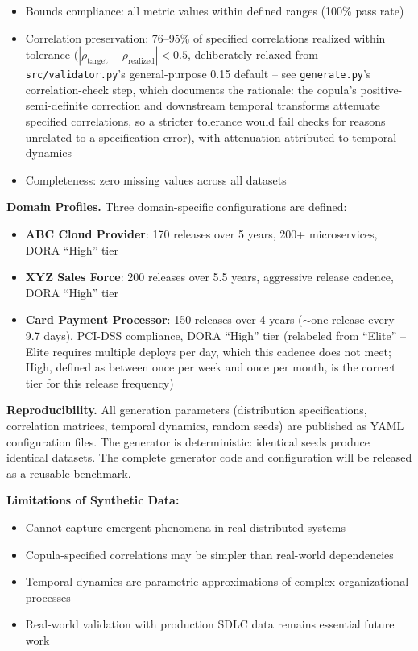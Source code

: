 \documentclass[technologies,article,submit,pdftex,moreauthors]{Definitions/mdpi}
\begin{document}
\begin{itemize}
\item
  Bounds compliance: all metric values within defined ranges (100\% pass
  rate)
\item
  Correlation preservation: 76--95\% of specified correlations realized
  within tolerance
  (\(|\rho_{\text{target}} - \rho_{\text{realized}}| < 0.5\), deliberately
  relaxed from \texttt{src/validator.py}'s general-purpose 0.15 default --
  see \texttt{generate.py}'s correlation-check step, which documents the
  rationale: the copula's positive-semi-definite correction and
  downstream temporal transforms attenuate specified correlations, so a
  stricter tolerance would fail checks for reasons unrelated to a
  specification error), with
  attenuation attributed to temporal dynamics
\item
  Completeness: zero missing values across all datasets
\end{itemize}

\textbf{Domain Profiles.} Three domain-specific configurations are
defined:

\begin{itemize}
\item
  \textbf{ABC Cloud Provider}: 170 releases over 5 years, 200+
  microservices, DORA ``High'' tier
\item
  \textbf{XYZ Sales Force}: 200 releases over 5.5 years, aggressive
  release cadence, DORA ``High'' tier
\item
  \textbf{Card Payment Processor}: 150 releases over 4 years
  ($\sim$one release every 9.7 days), PCI-DSS
  compliance, DORA ``High'' tier (relabeled from ``Elite'' -- Elite
  requires multiple deploys per day, which this cadence does not meet;
  High, defined as between once per week and once per month, is the
  correct tier for this release frequency)
\end{itemize}

\textbf{Reproducibility.} All generation parameters (distribution
specifications, correlation matrices, temporal dynamics, random seeds)
are published as YAML configuration files. The generator is
deterministic: identical seeds produce identical datasets. The complete
generator code and configuration will be released as a reusable
benchmark.

\textbf{Limitations of Synthetic Data:}

\begin{itemize}
\item
  Cannot capture emergent phenomena in real distributed systems
\item
  Copula-specified correlations may be simpler than real-world
  dependencies
\item
  Temporal dynamics are parametric approximations of complex
  organizational processes
\item
  Real-world validation with production SDLC data remains essential
  future work
\end{itemize}
\end{document}
